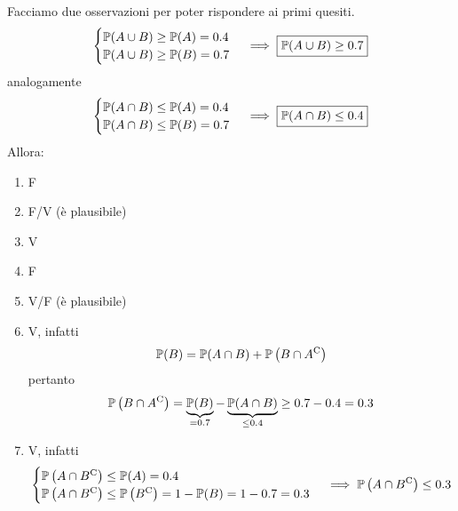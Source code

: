 Facciamo due osservazioni per poter rispondere ai primi quesiti.
\begin{equation*}
	\begin{cases}
		\mathbb{P}(A\cup B) \geq \mathbb{P}(A) =0.4\\
		\mathbb{P}(A\cup B) \geq \mathbb{P}(B) =0.7
	\end{cases}
	\implies \boxed{\mathbb{P}(A\cup B) \geq 0.7}
\end{equation*}
analogamente
\begin{equation*}
	\begin{cases}
		\mathbb{P}(A\cap B) \leq \mathbb{P}(A) =0.4\\
		\mathbb{P}(A\cap B) \leq \mathbb{P}(B) =0.7
	\end{cases}
	\implies \boxed{\mathbb{P}(A\cap B) \leq 0.4}
\end{equation*}
Allora:
\begin{enumerate}
	\item F
	\item F/V (è plausibile)
	\item V
	\item F
	\item V/F (è plausibile)
	\item V, infatti
	\begin{equation*}
		\mathbb{P}(B) =\mathbb{P}(A\cap B) +\mathbb{P}\left(B\cap A^{\mathrm{C}}\right)
	\end{equation*}
	pertanto
	\begin{equation*}
		\mathbb{P}\left(B\cap A^{\mathrm{C}}\right) =\underbrace{\mathbb{P}(B)}_{=0.7} -\underbrace{\mathbb{P}(A\cap B)}_{\leq 0.4} \geq 0.7-0.4=0.3
	\end{equation*}
	\item V, infatti
	\begin{equation*}
		\begin{cases}
			\mathbb{P}\left(A\cap B^{\mathrm{C}}\right) \leq \mathbb{P}(A) =0.4\\
			\mathbb{P}\left(A\cap B^{\mathrm{C}}\right) \leq \mathbb{P}\left(B^{\mathrm{C}}\right) =1-\mathbb{P}(B) =1-0.7=0.3
		\end{cases}
		\implies \mathbb{P}\left(A\cap B^{\mathrm{C}}\right) \leq 0.3
	\end{equation*}
\end{enumerate}

\Soluzione

